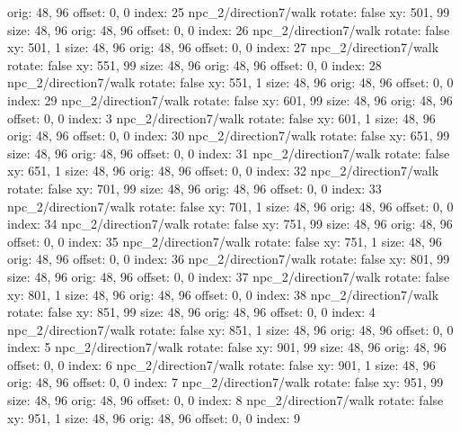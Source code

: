   orig: 48, 96
  offset: 0, 0
  index: 25
npc_2/direction7/walk
  rotate: false
  xy: 501, 99
  size: 48, 96
  orig: 48, 96
  offset: 0, 0
  index: 26
npc_2/direction7/walk
  rotate: false
  xy: 501, 1
  size: 48, 96
  orig: 48, 96
  offset: 0, 0
  index: 27
npc_2/direction7/walk
  rotate: false
  xy: 551, 99
  size: 48, 96
  orig: 48, 96
  offset: 0, 0
  index: 28
npc_2/direction7/walk
  rotate: false
  xy: 551, 1
  size: 48, 96
  orig: 48, 96
  offset: 0, 0
  index: 29
npc_2/direction7/walk
  rotate: false
  xy: 601, 99
  size: 48, 96
  orig: 48, 96
  offset: 0, 0
  index: 3
npc_2/direction7/walk
  rotate: false
  xy: 601, 1
  size: 48, 96
  orig: 48, 96
  offset: 0, 0
  index: 30
npc_2/direction7/walk
  rotate: false
  xy: 651, 99
  size: 48, 96
  orig: 48, 96
  offset: 0, 0
  index: 31
npc_2/direction7/walk
  rotate: false
  xy: 651, 1
  size: 48, 96
  orig: 48, 96
  offset: 0, 0
  index: 32
npc_2/direction7/walk
  rotate: false
  xy: 701, 99
  size: 48, 96
  orig: 48, 96
  offset: 0, 0
  index: 33
npc_2/direction7/walk
  rotate: false
  xy: 701, 1
  size: 48, 96
  orig: 48, 96
  offset: 0, 0
  index: 34
npc_2/direction7/walk
  rotate: false
  xy: 751, 99
  size: 48, 96
  orig: 48, 96
  offset: 0, 0
  index: 35
npc_2/direction7/walk
  rotate: false
  xy: 751, 1
  size: 48, 96
  orig: 48, 96
  offset: 0, 0
  index: 36
npc_2/direction7/walk
  rotate: false
  xy: 801, 99
  size: 48, 96
  orig: 48, 96
  offset: 0, 0
  index: 37
npc_2/direction7/walk
  rotate: false
  xy: 801, 1
  size: 48, 96
  orig: 48, 96
  offset: 0, 0
  index: 38
npc_2/direction7/walk
  rotate: false
  xy: 851, 99
  size: 48, 96
  orig: 48, 96
  offset: 0, 0
  index: 4
npc_2/direction7/walk
  rotate: false
  xy: 851, 1
  size: 48, 96
  orig: 48, 96
  offset: 0, 0
  index: 5
npc_2/direction7/walk
  rotate: false
  xy: 901, 99
  size: 48, 96
  orig: 48, 96
  offset: 0, 0
  index: 6
npc_2/direction7/walk
  rotate: false
  xy: 901, 1
  size: 48, 96
  orig: 48, 96
  offset: 0, 0
  index: 7
npc_2/direction7/walk
  rotate: false
  xy: 951, 99
  size: 48, 96
  orig: 48, 96
  offset: 0, 0
  index: 8
npc_2/direction7/walk
  rotate: false
  xy: 951, 1
  size: 48, 96
  orig: 48, 96
  offset: 0, 0
  index: 9

